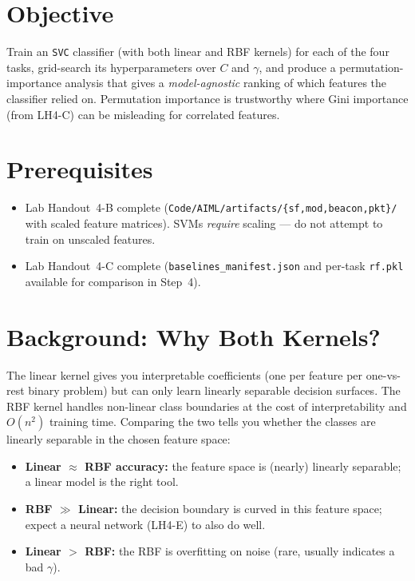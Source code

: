 \documentclass[11pt,letterpaper]{article}
\begin{document}

\section{Objective}
Train an \texttt{SVC} classifier (with both linear and \mbox{RBF} kernels) for each of the four tasks, grid-search its hyperparameters over $C$ and $\gamma$, and produce a permutation-importance analysis that gives a \emph{model-agnostic} ranking of which features the classifier relied on. Permutation importance is trustworthy where Gini importance (from LH4-C) can be misleading for correlated features.

\section{Prerequisites}
\begin{itemize}[leftmargin=2em]
	\item Lab Handout~4-B complete (\texttt{Code/AIML/artifacts/\{sf,mod,beacon,pkt\}/} with scaled feature matrices). \mbox{SVM}s \emph{require} scaling --- do not attempt to train on unscaled features.
	\item Lab Handout~4-C complete (\texttt{baselines\_manifest.json} and per-task \texttt{rf.pkl} available for comparison in Step~4).
\end{itemize}

\section{Background: Why Both Kernels?}
The linear kernel gives you interpretable coefficients (one per feature per one-vs-rest binary problem) but can only learn linearly separable decision surfaces. The \mbox{RBF} kernel handles non-linear class boundaries at the cost of interpretability and $O(n^2)$ training time. Comparing the two tells you whether the classes are linearly separable in the chosen feature space:

\begin{itemize}[leftmargin=2em]
	\item \textbf{Linear $\approx$ RBF accuracy:} the feature space is (nearly) linearly separable; a linear model is the right tool.
	\item \textbf{RBF $\gg$ Linear:} the decision boundary is curved in this feature space; expect a neural network (LH4-E) to also do well.
	\item \textbf{Linear $>$ RBF:} the \mbox{RBF} is overfitting on noise (rare, usually indicates a bad $\gamma$).
\end{itemize}
\end{document}
